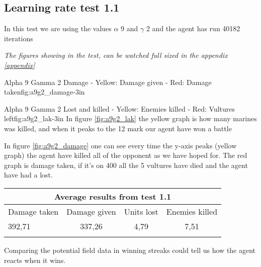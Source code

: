 \subsection*{Learning rate test 1.1}
In this test we are using the values $\alpha$ 9 and $\gamma$ 2 and the agent has run 40182 iterations


\textit{The figures showing in the test, can be watched full sized in the appendix \ref{appendix}} 

			{Alpha 9 Gamma 2 Damage - Yellow: Damage given - Red: Damage taken}{fig:a9g2_damage}{-3in}

			{Alpha 9 Gamma 2 Lost and killed - Yellow: Enemies killed - Red: Vultures left}{fig:a9g2_lak}{-3in}
In figure \ref{fig:a9g2_lak} the yellow graph is how many marines was killed, and when it peaks to the 12 mark our agent have won a battle




In figure \ref{fig:a9g2_damage} one can see every time the y-axis peaks (yellow graph) the agent have killed all of the opponent as we have hoped for. The red graph is damage taken, if it's on 400 all the 5 vultures have died and the agent have had a lost.

\begin{centering}
 \begin{tabular}{|l||c|c|c|}
	\multicolumn{4}{c}{Average results from test 1.1} \\
	\hline
		Damage taken & Damage given & Units lost & Enemies killed\\
	\hline
		392,71 & 337,26 & 4,79 & 7,51 \\
	\hline
\label{test1.1}
\end{tabular}
\end{centering}

Comparing the potential field data in winning streaks could tell us how the agent reacts when it wins.

